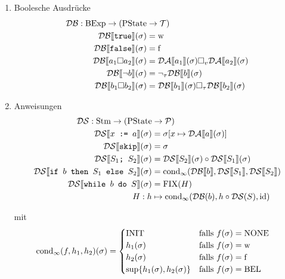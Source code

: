\begin{enumerate}
\begin{enumerate}
            \item Boolesche Ausdrücke \begin{align*}
                    \mathcal{DB} : \BExp \to (\PState & \to \mathcal{T}) \\
                    \mathcal{DB}\lsem\texttt{true}\rsem(\sigma) & = \true \\
                    \mathcal{DB}\lsem\texttt{false}\rsem(\sigma) & = \false \\
                    \mathcal{DB}\lsem a_1 \square a_2 \rsem(\sigma) & = \mathcal{DA}\lsem a_1 \rsem(\sigma) \square_v \mathcal{DA}\lsem a_2 \rsem(\sigma) \\
                    \mathcal{DB}\lsem \neg b \rsem(\sigma) & = \neg_{\tau} \mathcal{DB}\lsem b \rsem(\sigma) \\
                    \mathcal{DB}\lsem b_1 \square b_2 \rsem(\sigma) & = \mathcal{DB}\lsem b_1 \rsem(\sigma) \square_{\tau} \mathcal{DB}\lsem b_2 \rsem(\sigma)
                \end{align*}

            \item Anweisungen \begin{align*}
                    \mathcal{DS} : \Stm \to (\PState & \to \mathcal{P}) \\
                    \mathcal{DS}\lsem x \texttt{ := } a \rsem(\sigma) & = \sigma[x \mapsto \mathcal{DA}\lsem a \rsem(\sigma)] \\
                    \mathcal{DS}\lsem \texttt{skip} \rsem(\sigma) & = \sigma \\
                    \mathcal{DS}\lsem S_1 \texttt{; } S_2 \rsem(\sigma) & = \mathcal{DS}\lsem S_2 \rsem(\sigma) \circ \mathcal{DS}\lsem S_1 \rsem(\sigma) \\
                    \mathcal{DS}\lsem \texttt{if $b$ then $S_1$ else $S_2$} \rsem(\sigma) & = \cond_{\infty}(\mathcal{DB}\lsem b \rsem, \mathcal{DS}\lsem S_1 \rsem, \mathcal{DS}\lsem S_2 \rsem) \\
                    \mathcal{DS}\lsem \texttt{while $b$ do $S$} \rsem(\sigma) & = \fix(H) \\
                    H: h & \mapsto \cond_{\infty}(\mathcal{DB}(b), h \circ \mathcal{DS}(S), \id)
                \end{align*}

                mit \begin{align*}
                    \operatorname{cond}_{\infty}(f, h_1, h_2)(\sigma) & = \begin{cases}
                        \text{INIT} & \text{falls } f(\sigma) = \text{NONE} \\
                        h_1(\sigma) & \text{falls } f(\sigma) = \operatorname{w} \\
                        h_2(\sigma) & \text{falls } f(\sigma) = \operatorname{f} \\
                        \sup \{ h_1(\sigma), h_2(\sigma) \} & \text{falls } f(\sigma) = \text{BEL} \\
                    \end{cases}
                \end{align*}


\end{enumerate}
\end{enumerate}
